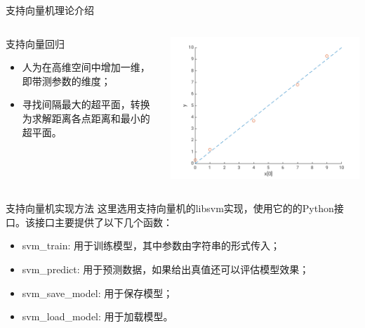 \documentclass[11pt]{beamer}
\begin{document}
	\begin{frame}{支持向量机}{理论介绍}
		\begin{columns}
			\begin{block}{支持向量回归}
				\begin{itemize}
					\item 人为在高维空间中增加一维，即带测参数的维度；
					\item 寻找间隔最大的超平面，转换为求解距离各点距离和最小的超平面。
				\end{itemize}
			\end{block}
			\includegraphics[width=\linewidth]{img/SVR}
		\end{columns}
	\end{frame}
	\begin{frame}{支持向量机}{实现方法}
		这里选用支持向量机的libsvm实现，使用它的的Python接口。该接口主要提供了以下几个函数：
		\begin{itemize}
			\item svm\_train: 用于训练模型，其中参数由字符串的形式传入；
			\item svm\_predict: 用于预测数据，如果给出真值还可以评估模型效果；
			\item svm\_save\_model: 用于保存模型；
			\item svm\_load\_model: 用于加载模型。
		\end{itemize}
	\end{frame}
\end{document}
